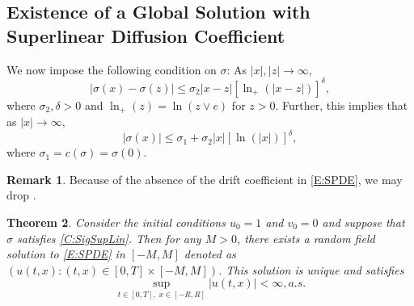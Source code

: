 \documentclass[a4paper,11pt]{article}
\numberwithin{equation}{section}
\theoremstyle{plain}
\newtheorem{theorem}{Theorem}[section]
\theoremstyle{definition}
\newtheorem{remark}[theorem]{Remark}
\numberwithin{NQ}{section}
\numberwithin{LQ}{section}
\numberwithin{ZQ}{section}
\begin{document}
	\subsection{Existence of a Global Solution with Superlinear Diffusion Coefficient}
	
	We now impose the following condition on $\sigma$: As $|x|,|z| \to \infty$,
	\begin{equation}
	\label{C:SigSupLin}
	|\sigma(x)-\sigma(z)| \le \sigma_2|x-z|[\ln_+(|x-z|)]^{\delta},
	\end{equation}
	where $\sigma_2 , \delta >0$ and $\ln_+(z) = \ln(z \vee e)$ for $z >0$. Further, this implies that as $|x| \to \infty$,
	\begin{equation}
	|\sigma(x)| \le \sigma_1 + \sigma_2|x|[\ln(|x|)]^{\delta},
	\end{equation}
	where $\sigma_1 = c(\sigma) = \sigma(0)$.
	
	\begin{remark}
		Because of the absence of the drift coefficient in \eqref{E:SPDE}, we may drop \cite[Assumption C1]{SoleMillet2021}.
	\end{remark}
	
	\begin{theorem}
		Consider the initial conditions $u_0=1$ and $v_0=0$ and suppose that $\sigma$ satisfies \eqref{C:SigSupLin}. Then for any $M>0$, there exists a random field solution to \eqref{E:SPDE} in $[-M,M]$ denoted as $(u(t,x): (t,x) \in [0,T]\times[-M,M])$. This solution is unique and satisfies 
		\begin{equation}
		\sup_{t\in[0,T],\; x\in[-R,R]} |u(t,x)| < \infty, a.s.
		\end{equation}
	\end{theorem}
	
\end{document}
